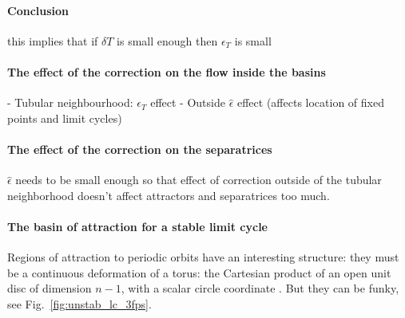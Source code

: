 \documentclass{article}
\theoremstyle{definition}
\theoremstyle{remark}
\newcounter{ct}
\begin{document}



\paragraph{Conclusion}
this implies that if $\delta T$ is small enough then $\epsilon_T$ is small %



\paragraph{The effect of the correction on the flow inside the basins}
- Tubular neighbourhood: $\epsilon_T$ effect
- Outside $\hat\epsilon$ effect (affects location of fixed points and limit cycles)

\paragraph{The effect of the correction on the separatrices}
 $\hat\epsilon$ needs to be small enough so that effect of correction outside of the tubular neighborhood doesn't affect attractors and separatrices too much.

\paragraph{The basin of attraction for a stable limit cycle}%
Regions of attraction to periodic orbits have an interesting structure: they must be a continuous deformation of a torus: the Cartesian product of an open unit disc of dimension $n-1$, with a scalar circle coordinate \citep{wilson1967structure}.
But they can be funky, see Fig.~\ref{fig:unstab_lc_3fps}.
\end{document}
